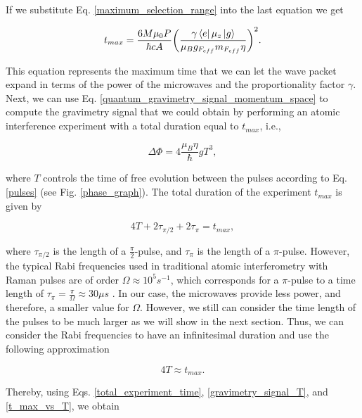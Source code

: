 \documentclass{article}
\begin{document}
If we substitute Eq. \ref{maximum_selection_range} into the last equation we get

\begin{equation}\label{total_experiment_time}
    t_{max} = \frac{6 M \mu_{0} P}{\hbar c A} \bigg(\frac{ \gamma  \bra{e} \mu_{z} \ket{g}}{\mu_{B} g_{F_{eff}} m_{F_{eff}} \eta}\bigg)^{2}.
\end{equation}

This equation represents the maximum time that we can let the wave packet expand in terms of the power of the microwaves and the proportionality factor $\gamma$. Next, we can use Eq. \ref{quantum_gravimetry_signal_momentum_space} to compute the gravimetry signal that we could obtain by performing an atomic interference experiment with a total duration equal to $t_{max}$, i.e., 

\begin{equation}\label{gravimetry_signal_T}
    \Delta \Phi = 4 \frac{\mu_{B} \eta }{\hbar} g T^{3},
\end{equation}

where $T$ controls the time of free evolution between the pulses according to Eq. \ref{pulses} (see Fig. \ref{phase_graph}). The total duration of the experiment $t_{max}$ is given by

\begin{equation}
    4 T + 2\tau_{\pi/2} + 2\tau_{\pi} = t_{max},
\end{equation}

where $\tau_{\pi/2}$ is the length of a $\frac{\pi}{2}$-pulse, and $\tau_{\pi}$ is the length of a $\pi$-pulse. However, the typical Rabi frequencies used in traditional atomic interferometry with Raman pulses are of order $\Omega \approx 10^5 s^{-1}$, which corresponds for a $\pi$-pulse to a time length of $\tau_{\pi} = \frac{\pi}{\Omega} \approx 30 \mu s$ \cite{Menoret2018}. In our case, the microwaves provide less power, and therefore, a smaller value for $\Omega$. However, we still can consider the time length of the pulses to be much larger as we will show in the next section. Thus, we can consider the Rabi frequencies to have an infinitesimal duration and use the following approximation

\begin{equation}\label{t_max_vs_T}
    4T \approx t_{max}.
\end{equation}

Thereby, using Eqs. \ref{total_experiment_time}, \ref{gravimetry_signal_T}, and \ref{t_max_vs_T}, we obtain
\end{document}
